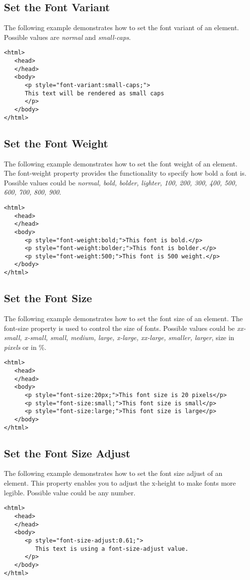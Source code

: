 \documentclass[a4paper,oneside]{book}
\numberwithin{equation}{chapter}
\begin{document}
\subsection{Set the Font Variant}
The following example demonstrates how to set the font variant of an element. Possible values are \textit{normal} and \textit{small-caps}.
\begin{verbatim}
<html>
   <head>
   </head>
   <body>
      <p style="font-variant:small-caps;">
      This text will be rendered as small caps
      </p>
   </body>
</html>
\end{verbatim}
\subsection{Set the Font Weight}
The following example demonstrates how to set the font weight of an element. The font-weight property provides the functionality to specify how bold a font is. Possible values could be \textit{normal, bold, bolder, lighter, 100, 200, 300, 400, 500, 600, 700, 800, 900}.
\begin{verbatim}
<html>
   <head>
   </head>
   <body>
      <p style="font-weight:bold;">This font is bold.</p>
      <p style="font-weight:bolder;">This font is bolder.</p>
      <p style="font-weight:500;">This font is 500 weight.</p>
   </body>
</html>
\end{verbatim}
\subsection{Set the Font Size}
The following example demonstrates how to set the font size of an element. The font-size property is used to control the size of fonts. Possible values could be \textit{xx-small, x-small, small, medium, large, x-large, xx-large, smaller, larger}, size in \textit{pixels} or in \%.
\begin{verbatim}
<html>
   <head>
   </head>
   <body>
      <p style="font-size:20px;">This font size is 20 pixels</p>
      <p style="font-size:small;">This font size is small</p>
      <p style="font-size:large;">This font size is large</p>
   </body>
</html>
\end{verbatim}
\subsection{Set the Font Size Adjust}
The following example demonstrates how to set the font size adjust of an element. This property enables you to adjust the x-height to make fonts more legible. Possible value could be any number.
\begin{verbatim}
<html>
   <head>
   </head>
   <body>
      <p style="font-size-adjust:0.61;">
         This text is using a font-size-adjust value.
      </p>
   </body>
</html>
\end{verbatim}
\end{document}
